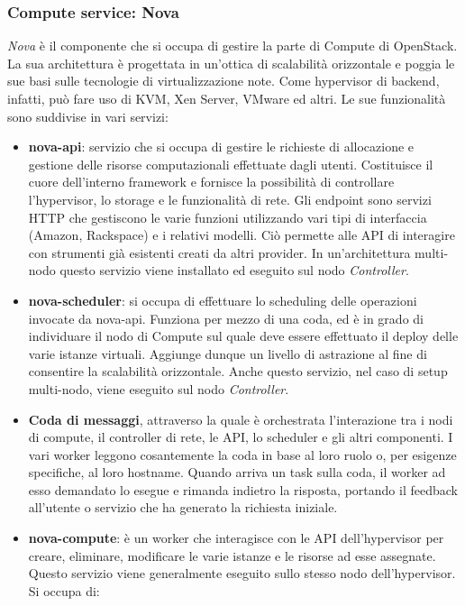 \documentclass[../main.tex]{subfiles}
\begin{document}
\subsubsection{Compute service: Nova}
\textit{Nova} è il componente che si occupa di gestire la parte di Compute di OpenStack. La sua architettura è progettata in un'ottica di scalabilità orizzontale e poggia le sue basi sulle tecnologie di virtualizzazione note. Come hypervisor di backend, infatti, può fare uso di KVM, Xen Server, VMware ed altri.
Le sue funzionalità sono suddivise in vari servizi:
\begin{itemize}
\item \textbf{nova-api}: servizio che si occupa di gestire le richieste di allocazione e gestione delle risorse computazionali effettuate dagli utenti.
Costituisce il cuore dell'interno framework e fornisce la possibilità di controllare l'hypervisor, lo storage e le funzionalità di rete.
Gli endpoint sono servizi HTTP che gestiscono le varie funzioni utilizzando vari tipi di interfaccia (Amazon, Rackspace) e i relativi modelli. Ciò permette alle API di interagire con strumenti già esistenti creati da altri provider.
In un'architettura multi-nodo questo servizio viene installato ed eseguito sul nodo \textit{Controller}.
\item \textbf{nova-scheduler}: si occupa di effettuare lo scheduling delle operazioni invocate da nova-api. Funziona per mezzo di una coda, ed è in grado di individuare il nodo di Compute sul quale deve essere effettuato il deploy delle varie istanze virtuali. Aggiunge dunque un livello di astrazione al fine di consentire la scalabilità orizzontale. Anche questo servizio, nel caso di setup multi-nodo, viene eseguito sul nodo \textit{Controller}.
\item \textbf{Coda di messaggi}, attraverso la quale è orchestrata l'interazione tra i nodi di compute, il controller di rete, le API, lo scheduler e gli altri componenti.
I vari worker leggono cosantemente la coda in base al loro ruolo o, per esigenze specifiche, al loro hostname.
Quando arriva un task sulla coda, il worker ad esso demandato lo esegue e rimanda indietro la risposta, portando il feedback all'utente o servizio che ha generato la richiesta iniziale.
\item \textbf{nova-compute}: è un worker che interagisce con le API dell'hypervisor per creare, eliminare, modificare le varie istanze e le risorse ad esse assegnate. Questo servizio viene generalmente eseguito sullo stesso nodo dell'hypervisor.
Si occupa di:
\begin{itemize}

\end{itemize}
\end{itemize}
\end{document}
